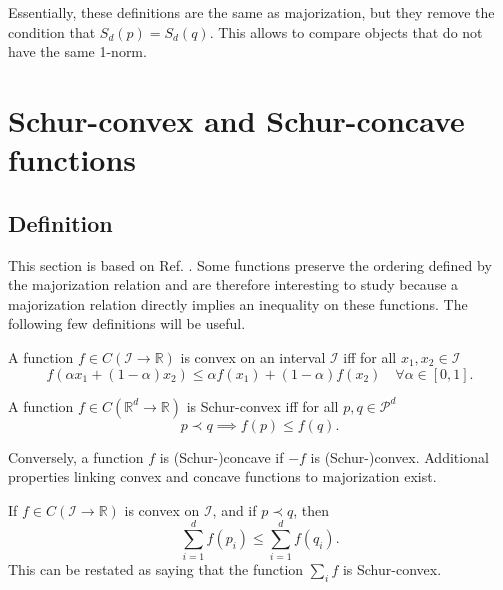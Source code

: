 Essentially, these definitions are the same as majorization, but they remove the condition that $S_d(p) = S_d(q)$. This allows to compare objects that do not have the same 1-norm.



\section{Schur-convex and Schur-concave functions}

\subsection{Definition}

This section is based on Ref. \cite[pp. 79--92]{marshall_inequalities_2011}. Some functions preserve the ordering defined by the majorization relation and are therefore interesting to study because a majorization relation directly implies an inequality on these functions. The following few definitions will be useful.

\begin{definition}
    A function $f \in C(\mathcal{I} \to \mathbb{R})$ is convex on an interval $\mathcal{I}$ iff for all $x_1, x_2 \in \mathcal{I}$
    \begin{equation}
        f(\alpha x_1 + (1-\alpha) x_2) \leq \alpha f(x_1) + (1-\alpha) f(x_2) \quad \forall \alpha \in [0, 1].
    \end{equation}
\end{definition}

\begin{definition}
    A function $f \in C(\mathbb{R}^d \to \mathbb{R})$ is Schur-convex iff for all $p, q \in \mathcal{P}^d$
    \begin{equation}
        p \prec q \implies f(p) \leq f(q).
    \end{equation}
\end{definition}

Conversely, a function $f$ is (Schur-)concave if $-f$ is (Schur-)convex. Additional properties linking convex and concave functions to majorization exist.

\begin{lemma} \label{lem:karamata}
    If $f \in C(\mathcal{I} \to \mathbb{R})$ is convex on $\mathcal{I}$, and if $p \prec q$, then
    \begin{equation}
        \sum_{i=1}^{d} f(p_i) \leq \sum_{i=1}^{d} f(q_i).
    \end{equation}
    This can be restated as saying that the function $\sum_i f$ is Schur-convex.
\end{lemma}

